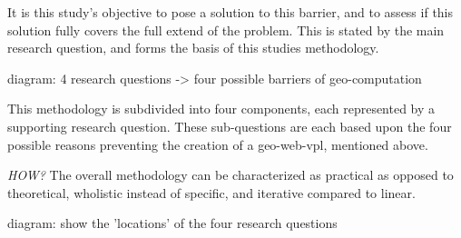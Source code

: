 It is this study's objective to pose a solution to this barrier, and to assess if this solution fully covers the full extend of the problem. This is stated by the main research question, and forms the basis of this studies methodology. 

\begin{note}
  diagram: 4 research questions -> four possible barriers of geo-computation
\end{note}


This methodology is subdivided into four components, each represented by a supporting research question. 
These sub-questions are each based upon the four possible reasons preventing the creation of a geo-web-vpl, mentioned above. 

\emph{HOW?}
The overall methodology can be characterized as practical as opposed to theoretical, wholistic instead of specific, and iterative compared to linear.






\begin{note}
  diagram: show the 'locations' of the four research questions
\end{note}

